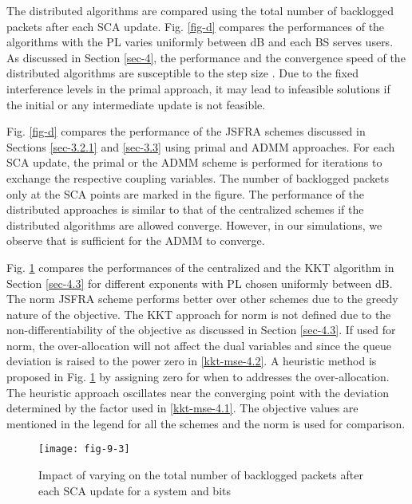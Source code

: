The distributed algorithms are compared using the total number of backlogged packets after each \ac{SCA} update. Fig. \ref{fig-d} compares the performances of the algorithms with the \ac{PL} varies uniformly between \me{[0,-6]} dB and each \ac{BS} serves  users. As discussed in Section \ref{sec-4}, the performance and the convergence speed of the distributed algorithms are susceptible to the step size . Due to the fixed interference levels in the primal approach, it may lead to infeasible solutions if the initial or any intermediate update is not feasible.

Fig. \ref{fig-d} compares the performance of the \ac{JSFRA} schemes discussed in Sections \ref{sec-3.2.1} and \ref{sec-3.3} using primal and \ac{ADMM} approaches. For each \ac{SCA} update, the primal or the \ac{ADMM} scheme is performed for  iterations to exchange the respective coupling variables. The number of backlogged packets only at the \ac{SCA} points are marked in the figure. The performance of the distributed approaches is similar to that of the centralized schemes if the distributed algorithms are allowed converge. However, in our simulations, we observe that  is sufficient for the \ac{ADMM} to converge. %

Fig. \ref{fig-d-3.1} compares the performances of the centralized and the \ac{KKT} algorithm in Section \ref{sec-4.3} for different exponents with \ac{PL} chosen uniformly between \me{[0,-3]} dB. The  norm \ac{JSFRA} scheme performs better over other schemes due to the greedy nature of the objective. The \ac{KKT} approach for  norm is not defined due to the non-differentiability of the objective as discussed in Section \ref{sec-4.3}. If used for  norm, the over-allocation will not affect the dual variables  and  since the queue deviation is raised to the power zero in \eqref{kkt-mse-4.2}. A heuristic method is proposed in Fig. \ref{fig-d-3.1} by assigning zero for  when  to addresses the over-allocation. The heuristic approach oscillates near the converging point with the deviation determined by the factor \me{\rho} used in \eqref{kkt-mse-4.1}. The objective values are mentioned in the legend for all the schemes and the  norm is used for comparison.
\begin{figure}
	\centering
	\texttt{[image: fig-9-3]}
	\vspace{-0.2in}
	\caption{Impact of varying  on the total number of backlogged packets after each \ac{SCA} update for a system  and  bits}
	\label{fig-d-3.1}
\end{figure}

